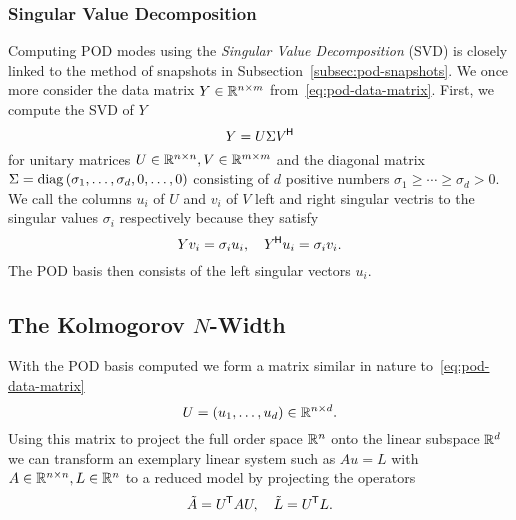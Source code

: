 \subsubsection{Singular Value Decomposition}\label{subsec:pod-svd}

Computing POD modes using the \emph{Singular Value Decomposition} (SVD) is closely linked to the method of snapshots in Subsection~\ref{subsec:pod-snapshots}.
We once more consider the data matrix $Y \in \mathbb{R}^{n \times m}$ from~\eqref{eq:pod-data-matrix}.
First, we compute the SVD of $Y$
\begin{equation*}
    Y = U \Sigma V^{\mkern-1.5mu \mathsf{H}}
\end{equation*}
for unitary matrices $U \in \mathbb{R}^{n \times n}, V \in \mathbb{R}^{m \times m}$ and the diagonal matrix $\Sigma = \mathop{}\!\mathrm{diag}\left(\sigma_1, \dots, \sigma_d, 0, \dots, 0\right)$ consisting of $d$ positive numbers $\sigma_1 \geq \cdots \geq \sigma_d > 0$.
We call the columns $u_i$ of $U$ and $v_i$ of $V$ left and right singular vectris to the singular values $\sigma_i$ respectively because they satisfy
\begin{equation*}
    Y v_i = \sigma_i u_i,\quad Y^{\mkern-1.5mu \mathsf{H}} u_i = \sigma_i v_i.
\end{equation*}
The POD basis then consists of the left singular vectors $u_i$.


\subsection[The Kolmogorov N-Width]{The Kolmogorov {$N$}-Width}\label{subsec:kolmogorov-n-width}

With the POD basis computed we form a matrix similar in nature to~\eqref{eq:pod-data-matrix}
\begin{equation*}
    U = \left( u_1, \dots, u_d \right) \in \mathbb{R}^{n \times d}.
\end{equation*}
Using this matrix to project the full order space $\mathbb{R}^n$ onto the linear subspace $\mathbb{R}^d$ we can transform an exemplary linear system such as $A u = L$ with $A \in \mathbb{R}^{n \times n}, L \in \mathbb{R}^n$ to a reduced model by projecting the operators
\begin{equation*}
    \tilde{A} = U^{\mkern-1.5mu \mathsf{T}} A U,\quad \tilde{L} = U^{\mkern-1.5mu \mathsf{T}} L.
\end{equation*}

